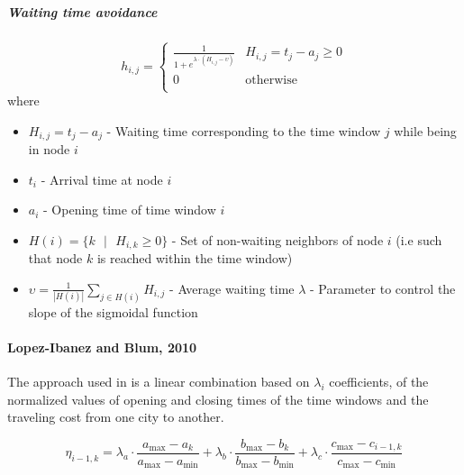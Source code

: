 \begin{homeworkProblem}
\subparagraph{Waiting time avoidance}
\begin{equation}
h_{i,j} = \begin{cases}
 \frac{1}{1+e^{\lambda \cdot (H_{i,j} - \upsilon)}}  &  H_{i,j} = t_j - a_j \geq 0 \\
0 & \text{otherwise} \\
\end{cases}
\end{equation}
where
\begin{itemize}
  \item $H_{i,j} = t_j - a_j$ - Waiting time corresponding to the time window $j$ while being in node $i$
  \item $t_i$ - Arrival time at node $i$
  \item $a_i$ - Opening time of time window $i$
  \item $H(i) = \{k\text{ } | \text{ }H_{i,k} \geq 0\}$ - Set of non-waiting neighbors of node $i$ (i.e such that node $k$ is reached within the time window)
  \item $\upsilon = \frac{1}{|H(i)|}\sum_{j \in H(i)}  H_{i,j}$ - Average waiting time 
  $\lambda$ - Parameter to control the slope of the sigmoidal function 
\end{itemize}


\paragraph{Lopez-Ibanez and Blum, 2010}
The approach used in \cite{lopez2010beam} is a linear combination based on $\lambda_i$ coefficients, of the normalized values of opening and closing times of the time windows and the traveling cost from one city to another.

\begin{equation} \label{eq:heuristic}
\eta_{i-1,k} = \lambda_{a} \cdot \frac{a_{\max}-a_{k}}{a_{\max}-a_{\min}} + \lambda_{b} \cdot \frac{b_{\max}-b_{k}}{b_{\max}-b_{\min}} + \lambda_{c} \cdot \frac{c_{\max}-c_{i-1,k}}{c_{\max}-c_{\min}}
\end{equation}


\end{homeworkProblem}
